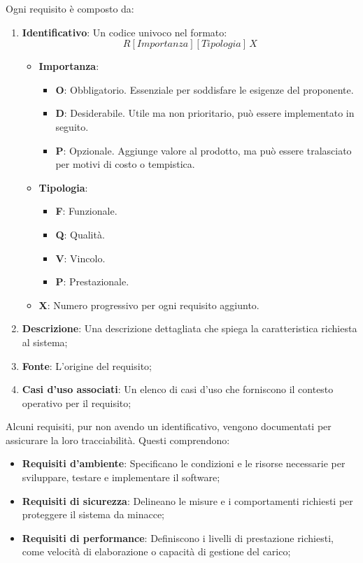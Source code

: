     Ogni requisito è composto da:
    \begin{enumerate}
    \item \textbf{Identificativo}: Un codice univoco nel formato:
    \[
    R[{Importanza}][{Tipologia}] \, X
    \]
    \begin{itemize}
        \item \textbf{Importanza}:
        \begin{itemize}
            \item \textbf{O}: Obbligatorio. Essenziale per soddisfare le esigenze del proponente.
            \item \textbf{D}: Desiderabile. Utile ma non prioritario, può essere implementato in seguito.
            \item \textbf{P}: Opzionale. Aggiunge valore al prodotto, ma può essere tralasciato per motivi di costo o tempistica.
        \end{itemize}
        \item \textbf{Tipologia}:
        \begin{itemize}
            \item \textbf{F}: Funzionale.
            \item \textbf{Q}: Qualità.
            \item \textbf{V}: Vincolo.
            \item \textbf{P}: Prestazionale.
        \end{itemize}
        \item \textbf{X}: Numero progressivo per ogni requisito aggiunto.
    \end{itemize}
    \item \textbf{Descrizione}: Una descrizione dettagliata che spiega la caratteristica richiesta al sistema;
    \item \textbf{Fonte}: L'origine del requisito;
    \item \textbf{Casi d’uso associati}: Un elenco di casi d'uso che forniscono il contesto operativo per il requisito;
    \end{enumerate}

    Alcuni requisiti, pur non avendo un identificativo, vengono documentati per assicurare la loro tracciabilità. Questi comprendono:
    \begin{itemize}
        \item \textbf{Requisiti d’ambiente}: 
        Specificano le condizioni e le risorse necessarie per sviluppare, testare e implementare il software;
        \item \textbf{Requisiti di sicurezza}: 
        Delineano le misure e i comportamenti richiesti per proteggere il sistema da minacce;
        \item \textbf{Requisiti di performance}: 
        Definiscono i livelli di prestazione richiesti, come velocità di elaborazione o capacità di gestione del carico;
    \end{itemize}

